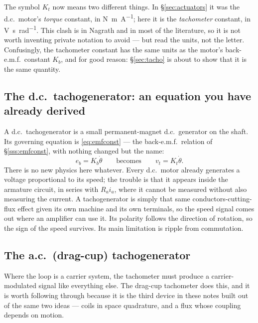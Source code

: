 \documentclass[11pt,a4paper]{article}
\begin{document}
\begin{pitfall}
The symbol $K_{t}$ now means two different things. In \S\ref{sec:actuators} it
was the d.c.\ motor's \emph{torque} constant, in \si{\newton\metre\per\ampere};
here it is the \emph{tachometer} constant, in \si{\volt\second\per\radian}.
This clash is in Nagrath and in most of the literature, so it is not worth
inventing private notation to avoid --- but read the units, not the letter.
Confusingly, the tachometer constant has the same units as the motor's
back-e.m.f.\ constant $K_{b}$, and for good reason: \S\ref{sec:tacho} is about
to show that it is the same quantity.
\end{pitfall}

\subsection{The d.c.\ tachogenerator: an equation you have already derived}

A d.c.\ tachogenerator is a small permanent-magnet d.c.\ generator on the
shaft. Its governing equation is \eqref{eq:emfconst} --- the back-e.m.f.\
relation of \S\ref{sss:emfconst}, with nothing changed but the name:
\[
  e_{b}=K_{b}\dot\theta
  \qquad\text{becomes}\qquad
  v_{t}=K_{t}\dot\theta .
\]
There is no new physics here whatever. Every d.c.\ motor already generates a
voltage proportional to its speed; the trouble is that it appears inside the
armature circuit, in series with $R_{a}i_{a}$, where it cannot be measured
without also measuring the current. A tachogenerator is simply that same
conductors-cutting-flux effect given its own machine and its own terminals, so
the speed signal comes out where an amplifier can use it. Its polarity follows
the direction of rotation, so the sign of the speed survives. Its main
limitation is ripple from commutation.

\subsection{The a.c.\ (drag-cup) tachogenerator}

Where the loop is a carrier system, the tachometer must produce a
carrier-modulated signal like everything else. The drag-cup tachometer does
this, and it is worth following through because it is the third device in these
notes built out of the same two ideas --- coils in space quadrature, and a
flux whose coupling depends on motion.
\end{document}
